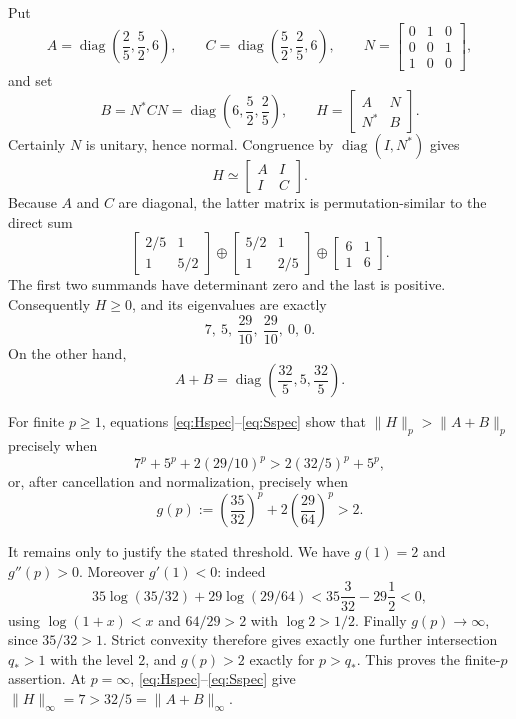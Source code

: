 \documentclass[11pt]{article}
\begin{document}
Put
\[
 A=\operatorname{diag}\!\left(\frac25,\frac52,6\right),\qquad
 C=\operatorname{diag}\!\left(\frac52,\frac25,6\right),\qquad
 N=\begin{bmatrix}0&1&0\\0&0&1\\1&0&0\end{bmatrix},
\]
and set
\[
 B=N^*CN=\operatorname{diag}\!\left(6,\frac52,\frac25\right),
 \qquad H=\begin{bmatrix}A&N\\N^*&B\end{bmatrix}.
\]
Certainly $N$ is unitary, hence normal.  Congruence by
$\operatorname{diag}(I,N^*)$ gives
\[
 H\simeq \begin{bmatrix}A&I\\I&C\end{bmatrix}.
\]
Because $A$ and $C$ are diagonal, the latter matrix is permutation-similar
to the direct sum
\[
 \begin{bmatrix}2/5&1\\1&5/2\end{bmatrix}
 \oplus
 \begin{bmatrix}5/2&1\\1&2/5\end{bmatrix}
 \oplus
 \begin{bmatrix}6&1\\1&6\end{bmatrix}.
\]
The first two summands have determinant zero and the last is positive.
Consequently $H\geq0$, and its eigenvalues are exactly
\begin{equation}\label{eq:Hspec}
 7,\ 5,\ \frac{29}{10},\ \frac{29}{10},\ 0,\ 0.
\end{equation}
On the other hand,
\begin{equation}\label{eq:Sspec}
 A+B=\operatorname{diag}\!\left(\frac{32}{5},5,\frac{32}{5}\right).
\end{equation}

For finite $p\geq1$, equations \eqref{eq:Hspec}--\eqref{eq:Sspec} show
that $\|H\|_p>\|A+B\|_p$ precisely when
\[
 7^p+5^p+2(29/10)^p>2(32/5)^p+5^p,
\]
or, after cancellation and normalization, precisely when
\begin{equation}\label{eq:gineq}
 g(p):=\left(\frac{35}{32}\right)^p
 +2\left(\frac{29}{64}\right)^p>2.
\end{equation}

It remains only to justify the stated threshold.  We have $g(1)=2$ and
$g''(p)>0$.  Moreover $g'(1)<0$: indeed
\[
 35\log(35/32)+29\log(29/64)<35\frac3{32}-29\frac12<0,
\]
using $\log(1+x)<x$ and $64/29>2$ with $\log2>1/2$.
Finally $g(p)\to\infty$, since $35/32>1$.  Strict convexity therefore gives
exactly one further intersection $q_*>1$ with the level $2$, and
$g(p)>2$ exactly for $p>q_*$.  This proves the finite-$p$ assertion.  At
$p=\infty$, \eqref{eq:Hspec}--\eqref{eq:Sspec} give
$\|H\|_\infty=7>32/5=\|A+B\|_\infty$.
\end{document}
